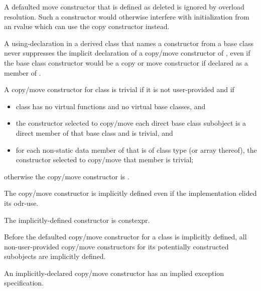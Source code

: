 \begin{note}
A defaulted move constructor that is defined as deleted is ignored by overload
resolution.
Such a constructor would otherwise interfere with initialization from
an rvalue which can use the copy constructor instead.
\end{note}

\pnum
\begin{note}
A using-declaration in a derived class  that
names a constructor from a base class
never suppresses the implicit declaration of
a copy/move constructor of ,
even if the base class constructor would be
a copy or move constructor
if declared as a member of .
\end{note}

\pnum
{}%
%
A copy/move constructor for class
is
trivial
if it is not user-provided and if
\begin{itemize}
\item
class
has no virtual functions
and no virtual base classes, and

\item
the constructor selected to copy/move each direct base class subobject
is a direct member of that base class and is trivial, and

\item
for each non-static data member of
that is of class type (or array thereof),
the constructor selected to copy/move that member is trivial;
\end{itemize}

%
otherwise the copy/move constructor is
.

\pnum
\begin{note}
The copy/move constructor is implicitly defined even if the implementation elided
its odr-use.
\end{note}
The implicitly-defined constructor is constexpr.

\pnum
Before the defaulted copy/move constructor for a class is
implicitly defined,
all non-user-provided copy/move constructors for its
potentially constructed subobjects
are implicitly defined.
\begin{note}
An implicitly-declared copy/move constructor has an
implied exception specification.
\end{note}

